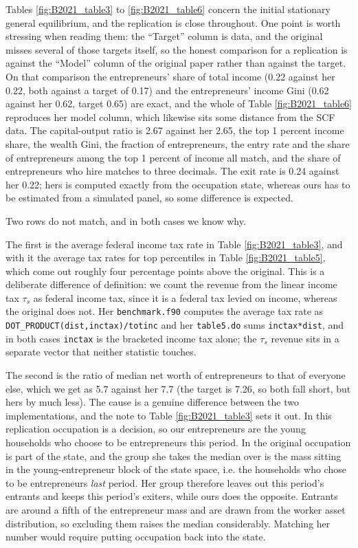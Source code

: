 \documentclass[11pt,fleqn]{article}
\begin{document}
Tables \ref{fig:B2021_table3} to \ref{fig:B2021_table6} concern the initial stationary general equilibrium, and the replication is close throughout. One point is worth stressing when reading them: the ``Target'' column is data, and the original misses several of those targets itself, so the honest comparison for a replication is against the ``Model'' column of the original paper rather than against the target. On that comparison the entrepreneurs' share of total income (0.22 against her 0.22, both against a target of 0.17) and the entrepreneurs' income Gini (0.62 against her 0.62, target 0.65) are exact, and the whole of Table \ref{fig:B2021_table6} reproduces her model column, which likewise sits some distance from the SCF data. The capital-output ratio is 2.67 against her 2.65, the top 1 percent income share, the wealth Gini, the fraction of entrepreneurs, the entry rate and the share of entrepreneurs among the top 1 percent of income all match, and the share of entrepreneurs who hire matches to three decimals. The exit rate is 0.24 against her 0.22; hers is computed exactly from the occupation state, whereas ours has to be estimated from a simulated panel, so some difference is expected.

Two rows do not match, and in both cases we know why.

The first is the average federal income tax rate in Table \ref{fig:B2021_table3}, and with it the average tax rates for top percentiles in Table \ref{fig:B2021_table5}, which come out roughly four percentage points above the original. This is a deliberate difference of definition: we count the revenue from the linear income tax $\tau_s$ as federal income tax, since it is a federal tax levied on income, whereas the original does not. Her \texttt{benchmark.f90} computes the average tax rate as \texttt{DOT\_PRODUCT(dist,inctax)/totinc} and her \texttt{table5.do} sums \texttt{inctax*dist}, and in both cases \texttt{inctax} is the bracketed income tax alone; the $\tau_s$ revenue sits in a separate vector that neither statistic touches.

The second is the ratio of median net worth of entrepreneurs to that of everyone else, which we get as 5.7 against her 7.7 (the target is 7.26, so both fall short, but hers by much less). The cause is a genuine difference between the two implementations, and the note to Table \ref{fig:B2021_table3} sets it out. In this replication occupation is a decision, so our entrepreneurs are the young households who choose to be entrepreneurs this period. In the original occupation is part of the state, and the group she takes the median over is the mass sitting in the young-entrepreneur block of the state space, i.e. the households who chose to be entrepreneurs \textit{last} period. Her group therefore leaves out this period's entrants and keeps this period's exiters, while ours does the opposite. Entrants are around a fifth of the entrepreneur mass and are drawn from the worker asset distribution, so excluding them raises the median considerably. Matching her number would require putting occupation back into the state.
\end{document}
